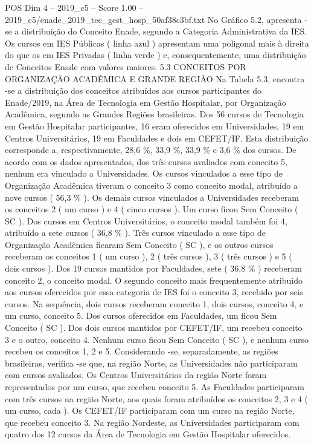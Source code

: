 \begin{textsample}{POS Dim 4 – 2019\_c5 – Score 1.00 – 2019\_c5/enade\_2019\_tec\_gest\_hosp\_50af38c3bf.txt}
No Gráfico 5.2, apresenta -se a distribuição do Conceito Enade, segundo a Categoria Administrativa da IES.
Os cursos em IES Públicas ( linha azul ) apresentam uma poligonal mais à direita do que os em IES Privadas ( linha verde ) e, consequentemente, uma distribuição de Conceitos Enade com valores maiores. 5.3 CONCEITOS POR ORGANIZAÇÃO ACADÊMICA E GRANDE REGIÃO Na Tabela 5.3, encontra -se a distribuição dos conceitos atribuídos aos cursos participantes do Enade/2019, na Área de Tecnologia em Gestão Hospitalar, por Organização Acadêmica, segundo as Grandes Regiões brasileiras.
Dos 56 cursos de Tecnologia em Gestão Hospitalar participantes, 16 eram oferecidos em Universidades, 19 em Centros Universitários, 19 em Faculdades e dois em CEFET/IF.
Esta distribuição corresponde a, respectivamente, 28,6 \%, 33,9 \%, 33,9 \% e 3,6 \% dos cursos.
De acordo com os dados apresentados, dos três cursos avaliados com conceito 5, nenhum era vinculado a Universidades.
Os cursos vinculados a esse tipo de Organização Acadêmica tiveram o conceito 3 como conceito modal, atribuído a nove cursos ( 56,3 \% ).
Os demais cursos vinculados a Universidades receberam os conceitos 2 ( um curso ) e 4 ( cinco cursos ).
Um curso ficou Sem Conceito ( SC ).
Dos cursos em Centros Universitários, o conceito modal também foi 4, atribuído a sete cursos ( 36,8 \% ).
Três cursos vinculado a esse tipo de Organização Acadêmica ficaram Sem Conceito ( SC ), e os outros cursos receberam os conceitos 1 ( um curso ), 2 ( três cursos ), 3 ( três cursos ) e 5 ( dois cursos ).
Dos 19 cursos mantidos por Faculdades, sete ( 36,8 \% ) receberam conceito 2, o conceito modal.
O segundo conceito mais frequentemente atribuído aos cursos oferecidos por essa categoria de IES foi o conceito 3, recebido por seis cursos.
Na sequência, dois cursos receberam conceito 1, dois cursos, conceito 4, e um curso, conceito 5.
Dos cursos oferecidos em Faculdades, um ficou Sem Conceito ( SC ).
Dos dois cursos mantidos por CEFET/IF, um recebeu conceito 3 e o outro, conceito 4.
Nenhum curso ficou Sem Conceito ( SC ), e nenhum curso recebeu os conceitos 1, 2 e 5.
Considerando -se, separadamente, as regiões brasileiras, verifica -se que, na região Norte, as Universidades não participaram com cursos avaliados.
Os Centros Universitários da região Norte foram representados por um curso, que recebeu conceito 5.
As Faculdades participaram com três cursos na região Norte, aos quais foram atribuídos os conceitos 2, 3 e 4 ( um curso, cada ).
Os CEFET/IF participaram com um curso na região Norte, que recebeu conceito 3.
Na região Nordeste, as Universidades participaram com quatro dos 12 cursos da Área de Tecnologia em Gestão Hospitalar oferecidos.

\end{textsample}
